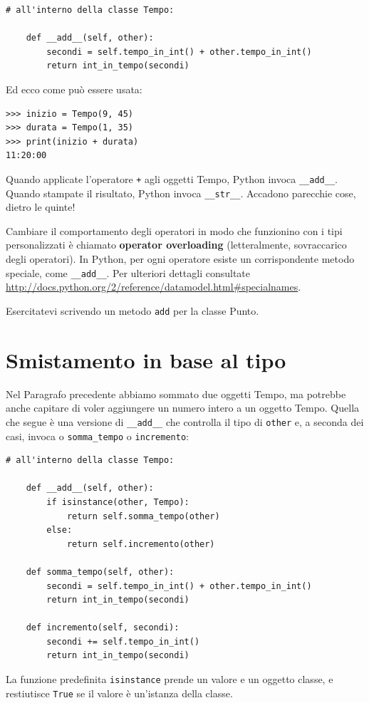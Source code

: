 \documentclass[10pt]{book}
\begin{document}
\begin{verbatim}
# all'interno della classe Tempo:

    def __add__(self, other):
        secondi = self.tempo_in_int() + other.tempo_in_int()
        return int_in_tempo(secondi)
\end{verbatim}
%
Ed ecco come può essere usata:

\begin{verbatim}
>>> inizio = Tempo(9, 45)
>>> durata = Tempo(1, 35)
>>> print(inizio + durata)
11:20:00
\end{verbatim}
%
Quando applicate l'operatore {\tt +} agli oggetti Tempo, Python invoca
\verb"__add__".  Quando stampate il risultato, Python invoca 
\verb"__str__".  Accadono parecchie cose, dietro le quinte!

Cambiare il comportamento degli operatori in modo che funzionino con i tipi personalizzati è chiamato {\bf operator overloading} (letteralmente, sovraccarico degli operatori). In Python, per ogni operatore esiste un corrispondente metodo speciale, come
\verb"__add__".  Per ulteriori dettagli consultate
\url{http://docs.python.org/2/reference/datamodel.html#specialnames}.

Esercitatevi scrivendo un metodo {\tt add} per la classe Punto.  


\section{Smistamento in base al tipo}

Nel Paragrafo precedente abbiamo sommato due oggetti Tempo, ma potrebbe anche capitare di voler aggiungere un numero intero a un oggetto Tempo. Quella che segue è una versione di \verb"__add__"
che controlla il tipo di {\tt other} e, a seconda dei casi, invoca o
\verb"somma_tempo" o {\tt incremento}:

\begin{verbatim}
# all'interno della classe Tempo:

    def __add__(self, other):
        if isinstance(other, Tempo):
            return self.somma_tempo(other)
        else:
            return self.incremento(other)

    def somma_tempo(self, other):
        secondi = self.tempo_in_int() + other.tempo_in_int()
        return int_in_tempo(secondi)

    def incremento(self, secondi):
        secondi += self.tempo_in_int()
        return int_in_tempo(secondi)
\end{verbatim}
%
La funzione predefinita {\tt isinstance} prende un valore e un oggetto classe, e restiutisce {\tt True} se il valore è un'istanza della classe.
\end{document}
